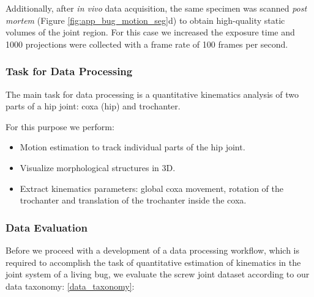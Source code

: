 Additionally, after \textit{in vivo} data acquisition, the same specimen was scanned \textit{post mortem} (Figure \ref{fig:app_bug_motion_seg}d) to obtain high-quality static
volumes of the joint region. For this case we increased the exposure time and 1000 projections were collected with a frame rate of 100 frames per second.


\subsubsection{Task for Data Processing}

The main task for data processing is a quantitative kinematics analysis of two parts of a hip joint: coxa (hip)
and trochanter. 

For this purpose we perform:
\begin{itemize}
	\item Motion estimation to track individual parts of the hip joint.
	
	\item Visualize morphological structures in 3D.
	
	\item Extract kinematics parameters: global coxa movement, rotation of the trochanter and translation of the trochanter inside the coxa.
	
\end{itemize}


\subsubsection{Data Evaluation}

Before we proceed with a development of a data processing workflow, which is required to accomplish the task of quantitative estimation of kinematics in the joint system of a living bug, we evaluate the screw joint dataset according to our data taxonomy: \ref{data_taxonomy}:

